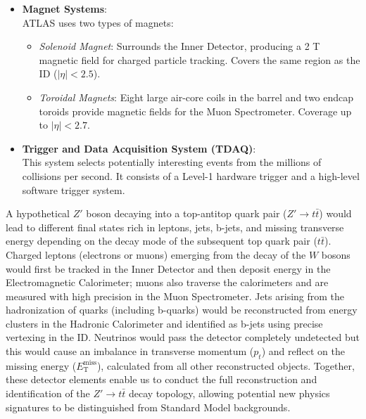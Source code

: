 \begin{itemize}
\item \textbf{Magnet Systems}:
\\ATLAS uses two types of magnets:
\begin{itemize}
    \item \textit{Solenoid Magnet}: Surrounds the Inner Detector, producing a 2 T magnetic field for charged particle tracking. Covers the same region as the ID ($|\eta| < 2.5$).
    \item \textit{Toroidal Magnets}: Eight large air-core coils in the barrel and two endcap toroids provide magnetic fields for the Muon Spectrometer. Coverage up to $|\eta| < 2.7$.
\end{itemize}

\item \textbf{Trigger and Data Acquisition System (TDAQ)}:
\\This system selects potentially interesting events from the millions of collisions per second. It consists of a Level-1 hardware trigger and a high-level software trigger system.
\end{itemize}

A hypothetical $Z'$ boson decaying into a top-antitop quark pair ($Z' \rightarrow t\bar{t}$) would lead to different final states rich in leptons, jets, b-jets, and missing transverse energy depending on the decay mode of the subsequent top quark pair ($t\bar{t}$). Charged leptons (electrons or muons) emerging from the decay of the $W$ bosons would first be tracked in the Inner Detector and then deposit energy in the Electromagnetic Calorimeter; muons also traverse the calorimeters and are measured with high precision in the Muon Spectrometer. Jets arising from the hadronization of quarks (including b-quarks) would be reconstructed from energy clusters in the Hadronic Calorimeter and identified as b-jets using precise vertexing in the ID. Neutrinos would pass the detector completely undetected but this would cause an imbalance in transverse momentum ($p_t$) and reflect on the missing energy ($E_{\mathrm{T}}^{\mathrm{miss}}$), calculated from all other reconstructed objects. Together, these detector elements enable us to conduct the full reconstruction and identification of the $Z' \rightarrow t\bar{t}$ decay topology, allowing potential new physics signatures to be distinguished from Standard Model backgrounds.


